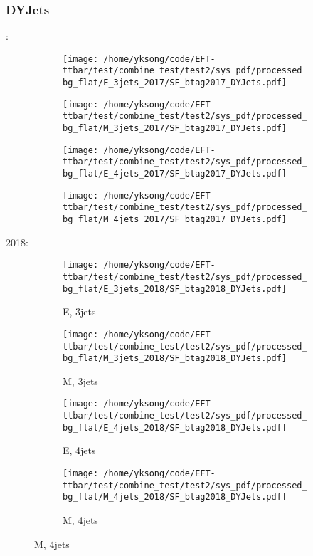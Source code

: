 \documentclass{beamer}
\begin{document}
\begin{frame}
\frametitle{DYJets}
\fontsize{5}{1}:
\begin{figure}
\centering
\begin{subfigure}[b]{0.24\textwidth}
\texttt{[image: /home/yksong/code/EFT-ttbar/test/combine\_test/test2/sys\_pdf/processed\_bg\_flat/E\_3jets\_2017/SF\_btag2017\_DYJets.pdf]}
\end{subfigure}
\begin{subfigure}[b]{0.24\textwidth}
\texttt{[image: /home/yksong/code/EFT-ttbar/test/combine\_test/test2/sys\_pdf/processed\_bg\_flat/M\_3jets\_2017/SF\_btag2017\_DYJets.pdf]}
\end{subfigure}
\begin{subfigure}[b]{0.24\textwidth}
\texttt{[image: /home/yksong/code/EFT-ttbar/test/combine\_test/test2/sys\_pdf/processed\_bg\_flat/E\_4jets\_2017/SF\_btag2017\_DYJets.pdf]}
\end{subfigure}
\begin{subfigure}[b]{0.24\textwidth}
\texttt{[image: /home/yksong/code/EFT-ttbar/test/combine\_test/test2/sys\_pdf/processed\_bg\_flat/M\_4jets\_2017/SF\_btag2017\_DYJets.pdf]}
\end{subfigure}
\end{figure}
2018:
\begin{figure}
\centering
\begin{subfigure}[b]{0.24\textwidth}
\texttt{[image: /home/yksong/code/EFT-ttbar/test/combine\_test/test2/sys\_pdf/processed\_bg\_flat/E\_3jets\_2018/SF\_btag2018\_DYJets.pdf]}
\captionsetup{font=tiny}
\caption{E, 3jets}
\end{subfigure}
\begin{subfigure}[b]{0.24\textwidth}
\texttt{[image: /home/yksong/code/EFT-ttbar/test/combine\_test/test2/sys\_pdf/processed\_bg\_flat/M\_3jets\_2018/SF\_btag2018\_DYJets.pdf]}
\captionsetup{font=tiny}
\caption{M, 3jets}
\end{subfigure}
\begin{subfigure}[b]{0.24\textwidth}
\texttt{[image: /home/yksong/code/EFT-ttbar/test/combine\_test/test2/sys\_pdf/processed\_bg\_flat/E\_4jets\_2018/SF\_btag2018\_DYJets.pdf]}
\captionsetup{font=tiny}
\caption{E, 4jets}
\end{subfigure}
\begin{subfigure}[b]{0.24\textwidth}
\texttt{[image: /home/yksong/code/EFT-ttbar/test/combine\_test/test2/sys\_pdf/processed\_bg\_flat/M\_4jets\_2018/SF\_btag2018\_DYJets.pdf]}
\captionsetup{font=tiny}
\caption{M, 4jets}
\end{subfigure}
\end{figure}
\end{frame}
\end{document}
